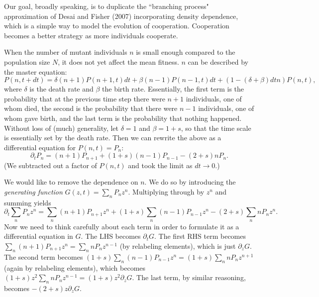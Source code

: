 \documentclass[10pt]{revtex4}
\begin{document}
Our goal, broadly speaking, is to duplicate the ``branching process" approximation of Desai and Fisher (2007) incorporating density dependence, which is a simple way to model the evolution of cooperation.
Cooperation becomes a better strategy as more individuals cooperate.

When the number of mutant individuals $n$ is small enough compared to the population size $N$, it does not yet affect the mean fitness.
$n$ can be described by the master equation:
\begin{equation}
P(n,t+dt) = \delta(n+1)P(n+1,t)dt + \beta(n-1)P(n-1,t)dt + (1-(\delta + \beta)dt n)P(n,t),
\end{equation}
where $\delta$ is the death rate and $\beta$ the birth rate.
Essentially, the first term is the probability that at the previous time step there were $n+1$ individuals, one of whom died, the second is the probability that there were $n-1$ individuals, one of whom gave birth, and the last term is the probability that nothing happened.
Without loss of (much) generality, let $\delta = 1$ and $\beta = 1+s$, so that the time scale is essentially set by the death rate.
Then we can rewrite the above as a differential equation for $P(n,t) = P_n$:
\begin{equation}
\partial_t P_n = (n+1)P_{n+1} + (1+s)(n-1)P_{n-1} - (2+s) nP_n.
\end{equation}
(We subtracted out a factor of $P(n,t)$ and took the limit as $dt \to 0$.)

We would like to remove the dependence on $n$.
We do so by introducing the \emph{generating function} $G(z,t) = \sum_n P_n z^n$.
Multiplying through by $z^n$ and summing yields
\begin{equation}
\partial_t  \sum_n P_n z^n =  \sum_n (n+1)P_{n+1} z^n + (1+s) \sum_n (n-1)P_{n-1}z^n - (2+s)\sum_n nP_n z^n.
\end{equation}
Now we need to think carefully about each term in order to formulate it as a differential equation in $G$.
The LHS becomes $\partial_t G$.
The first RHS term becomes $\sum_n (n+1)P_{n+1} z^n = \sum_n n P_{n} z^{n-1}$ (by relabeling elements), which is just $\partial_z G$.
The second term becomes $(1+s) \sum_n (n-1)P_{n-1}z^n = (1+s) \sum_n n P_n z^{n+1}$ (again by relabeling elements), which becomes $(1+s)z^2 \sum_n n P_n z^{n-1} = (1+s) z^2 \partial_z G$.
The last term, by similar reasoning, becomes $-(2+s) z \partial_z G$.
\end{document}
